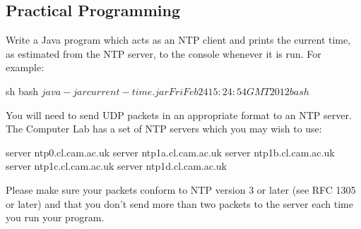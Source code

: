 \documentclass{supervision}
\begin{document}
\begin{questions}

    \section*{Practical Programming}
    \question Write a Java program which acts as an NTP client and prints the
      current time, as estimated from the NTP server, to the console whenever
      it is run. For example:

      \begin{code}{sh}
        bash $ java -jar current-time.jar
        Fri Feb 24 15:24:54 GMT 2012
        bash $
      \end{code}

      You will need to send UDP packets in an appropriate format to an NTP
      server. The Computer Lab has a set of NTP servers which you may wish to
      use:

      \begin{code}{}
        server ntp0.cl.cam.ac.uk
        server ntp1a.cl.cam.ac.uk
        server ntp1b.cl.cam.ac.uk
        server ntp1c.cl.cam.ac.uk
        server ntp1d.cl.cam.ac.uk
      \end{code}

      Please make sure your packets conform to NTP version 3 or later (see RFC
      1305 or later) and that you don't send more than two packets to the
      server each time you run your program.
  \end{questions}
\end{document}
